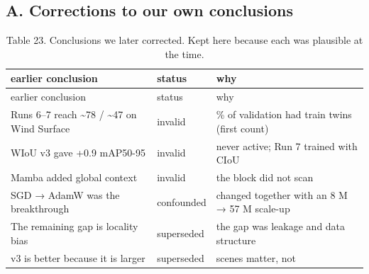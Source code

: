 \documentclass[
  10pt,
]{article}
\begin{document}
\subsection*{A. Corrections to our own
conclusions}\label{a.-corrections-to-our-own-conclusions}

\begin{longtable}[]{@{}
  >{\raggedright\arraybackslash}p{}
  >{\raggedright\arraybackslash}p{}
  >{\raggedright\arraybackslash}p{}@{}}
\caption{Table 23. Conclusions we later corrected. Kept here because
each was plausible at the time.}\tabularnewline
\toprule\noalign{}
\begin{minipage}[b]{\linewidth}\raggedright
earlier conclusion
\end{minipage} & \begin{minipage}[b]{\linewidth}\raggedright
status
\end{minipage} & \begin{minipage}[b]{\linewidth}\raggedright
why
\end{minipage} \\
\midrule\noalign{}
\endfirsthead
\toprule\noalign{}
\begin{minipage}[b]{\linewidth}\raggedright
earlier conclusion
\end{minipage} & \begin{minipage}[b]{\linewidth}\raggedright
status
\end{minipage} & \begin{minipage}[b]{\linewidth}\raggedright
why
\end{minipage} \\
\midrule\noalign{}
\endhead
\bottomrule\noalign{}
\endlastfoot
Runs 6--7 reach \textasciitilde78 / \textasciitilde47 on Wind Surface &
invalid & 75\% of validation had train twins (first count) \\
WIoU v3 gave +0.9 mAP50-95 & invalid & never active; Run 7 trained with
CIoU \\
Mamba added global context & invalid & the block did not scan \\
SGD → AdamW was the breakthrough & confounded & changed together with an
8 M → 57 M scale-up \\
The remaining gap is locality bias & superseded & the gap was leakage
and data structure \\
v3 is better because it is larger & superseded & scenes matter, not

\end{longtable}
\end{document}
